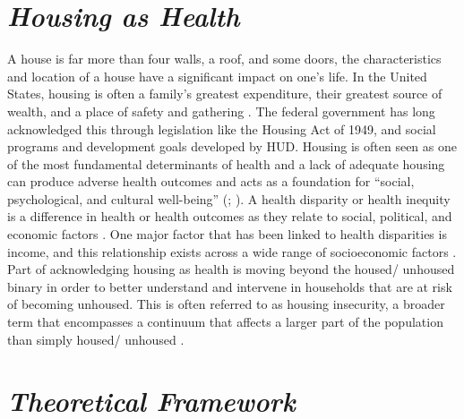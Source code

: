 \section{\textit{Housing as Health}}
A house is far more than four walls, a roof, and some doors, the characteristics and location of a house have a significant impact on one’s life. In the United States, housing is often a family’s greatest expenditure, their greatest source of wealth, and a place of safety and gathering \citep{braveman_housing_2011}. The federal government has long acknowledged this through legislation like the Housing Act of 1949, and social programs and development goals developed by HUD. Housing is often seen as one of the most fundamental determinants of health and a lack of adequate housing can produce adverse health outcomes and acts as a foundation for “social, psychological, and cultural well-being” (\citealp[p.17]{dalessandro_housing_2020}; \citealp{leifheit_building_2022}).  A health disparity or health inequity is a difference in health or health outcomes as they relate to social, political, and economic factors \citep{lutfiyya_rurality_2012}. One major factor that has been linked to health disparities is income, and this relationship exists across a wide range of socioeconomic factors \citep{canto_rural_2014}.  Part of acknowledging housing as health is moving beyond the housed/ unhoused binary in order to better understand and intervene in households that are at risk of becoming unhoused. This is often referred to as housing insecurity, a broader term that encompasses a continuum that affects a larger part of the population than simply housed/ unhoused \citep{deluca_housing_2022}.

\section{\textit{Theoretical Framework}}

